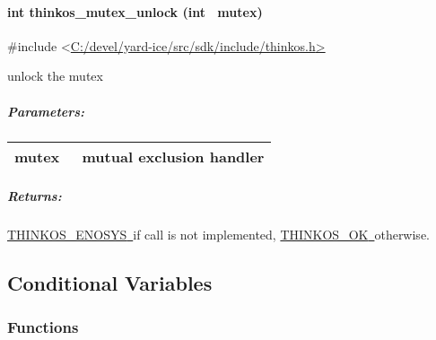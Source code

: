{\paragraph{\texorpdfstring{{int thinkos\_mutex\_unlock (int
~mutex)}}{int thinkos\_mutex\_unlock (int ~mutex)}}\label{int-thinkos_mutex_unlock-int-mutex}

{}

{\#include
\textless{}}{\protect\hyperlink{h.pkwqa1}{C:/devel/yard-ice/src/sdk/include/thinkos.h}}{\protect\hyperlink{h.pkwqa1}{\textgreater{}}}

{unlock the mutex }

{}

\subparagraph{\texorpdfstring{{Parameters:}}{Parameters:}}\label{parameters-13}

\protect\hypertarget{t.b0b883f74d2462ca881bd7f4d0508cf144bbde9b}{}{}\protect\hypertarget{t.13}{}{}

\begin{longtable}[]{@{}ll@{}}
\toprule
\begin{minipage}[t]{0.47\columnwidth}\raggedright\strut
{mutex}{~}\strut
\end{minipage} & \begin{minipage}[t]{0.47\columnwidth}\raggedright\strut
{mutual exclusion handler }\strut
\end{minipage}\tabularnewline
\bottomrule
\end{longtable}

\subparagraph{\texorpdfstring{{Returns:}}{Returns:}}\label{returns-16}

{\protect\hyperlink{h.3s49zyc}{THINKOS\_ENOSYS}}{\protect\hyperlink{h.3s49zyc}{~}}{if
call is not implemented,
}{\protect\hyperlink{h.2fk6b3p}{THINKOS\_OK}}{\protect\hyperlink{h.2fk6b3p}{~}}{otherwise.
}

\paragraph{\texorpdfstring{{}}{}}\label{section-2}

\subsection{\texorpdfstring{{Conditional
Variables}}{Conditional Variables}}\label{conditional-variables}

\subsubsection{\texorpdfstring{{Functions}}{Functions}}\label{h.2xcytpi}

}

